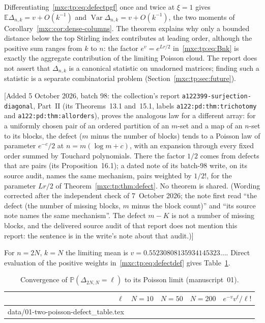 \documentclass[11pt]{article}
\makeatletter
\numberwithin{equation}{section}
\theoremstyle{definition}
\theoremstyle{remark}
\newcommand{\E}{\mathbb E}
\newcommand{\Pp}{\mathbb P}
\DeclareMathOperator{\Var}{Var}
\newcommand{\tableinput}[1]{\@@input #1 }
\makeatother
\begin{document}
Differentiating~\eqref{mxc:tp:eq:defectpgf} once and twice at $\xi=1$ gives
$\E\Delta_{n,k}=v+O(k^{-1})$ and $\Var\Delta_{n,k}=v+O(k^{-1})$, the two
moments of Corollary~\ref{mxc:cor:dense-columns}. The theorem explains
why only a bounded distance below the top Stirling index contributes at
leading order, although the positive sum ranges from $k$ to $n$: the
factor $e^{v}=e^{Lr/2}$ in~\eqref{mxc:tp:eq:Bnk} is exactly the aggregate
contribution of the limiting Poisson cloud. The report does not assert
that $\Delta_{n,k}$ is a canonical statistic on unadorned matrices;
finding such a statistic is a separate combinatorial problem
(Section~\ref{mxc:tp:sec:future}).

[Added 5 October 2026, batch 98: the collection's report
\texttt{a122399-\allowbreak surjection-\allowbreak diagonal}, Part~II
(its Theorems~13.1 and~15.1, labels \texttt{a122:pd:thm:trichotomy} and
\texttt{a122:pd:thm:allorders}), proves the analogous law for a different
array: for a uniformly chosen pair of an ordered partition of an $m$-set
and a map of an $n$-set to its blocks, the defect ($m$ minus the number
of blocks) tends to a Poisson law of parameter
$e^{-c}/2$ at $n=m(\log m+c)$, with an expansion through every fixed order
summed by Touchard polynomials. There the factor $1/2$ comes from defects
that are pairs (its Proposition~16.1); a dated note of its batch-98 write,
on its source audit, names the same mechanism, pairs weighted by $1/2!$,
for the parameter $Lr/2$ of
Theorem~\ref{mxc:tp:thm:defect}. No theorem is shared.
\textup{(Wording corrected after the independent check of 7~October 2026;
the note first read ``the defect (the number of missing blocks, $m$ minus
the block count)'' and ``its source note names the same mechanism''. The
defect $m-K$ is not a number of missing blocks, and the delivered source
audit of that report does not mention this report: the sentence is in the
write's note about that audit.)}]

For $n=2N$, $k=N$ the limiting mean is $v=0.55230808135934145323\ldots$.
Direct evaluation of the positive weights in~\eqref{mxc:tp:eq:defectdef}
gives Table~\ref{mxc:tp:tab:defect}.
\begin{table}[htbp]
\centering\small
\begin{tabular}{@{}rrrrr@{}}
\toprule
$\ell$ & $N=10$ & $N=50$ & $N=200$ & $e^{-v}v^\ell/\ell!$\\
\midrule
\tableinput{data/01-two-poisson-defect_table.tex}
\bottomrule
\end{tabular}
\caption{Convergence of $\Pp(\Delta_{2N,N}=\ell)$ to its Poisson limit
(manuscript~01).}
\label{mxc:tp:tab:defect}
\end{table}
\end{document}
